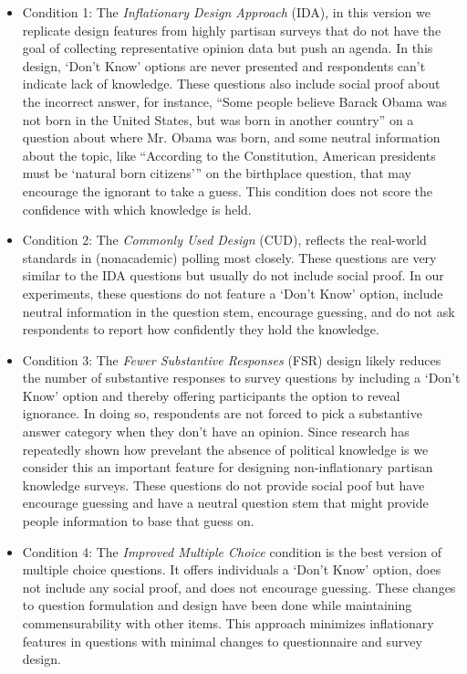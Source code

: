 \documentclass[12pt, letterpaper]{article}
\begin{document}
\begin{itemize}

  \item Condition 1: The \textit{Inflationary Design Approach} (IDA), in this version we replicate design features from highly partisan surveys that do not have the goal of collecting representative opinion data but push an agenda. In this design, `Don't Know' options are never presented and respondents can't indicate lack of knowledge. These questions also include social proof  about the incorrect answer, for instance, ``Some people believe Barack Obama was not born in the United States, but was born in another country'' on a question about where Mr. Obama was born, and some neutral information about the topic, like ``According to the Constitution, American presidents must be `natural born citizens''' on the birthplace question, that may encourage the ignorant to take a guess.  This condition does not score the confidence with which knowledge is held.

  \item Condition 2: The \textit{Commonly Used Design} (CUD), reflects the real-world standards in (nonacademic) polling most closely. These questions are very similar to the IDA questions but usually do not include social proof. In our experiments, these questions do not feature a `Don't Know' option, include neutral information in the question stem, encourage guessing, and do not ask respondents to report how confidently they hold the knowledge.

\item Condition 3: The \textit{Fewer Substantive Responses} (FSR) design likely reduces the number of substantive responses to survey questions by including a `Don't Know' option and thereby offering participants the option to reveal ignorance. In doing so, respondents are not forced to pick a substantive answer category when they don't have an opinion. Since research has repeatedly shown how prevelant the absence of political knowledge is we consider this an important feature for designing non-inflationary partisan knowledge surveys. These questions do not provide social poof but have encourage guessing and have a neutral question stem that might provide people information to base that guess on.

	\item Condition 4: The \textit{Improved Multiple Choice} condition is the best version of multiple choice questions. It offers individuals a `Don't Know' option, does not include any social proof, and does not encourage guessing. These changes to question formulation and design have been done while maintaining commensurability with other items. This approach minimizes inflationary features in questions with minimal changes to questionnaire and survey design.


\end{itemize}
\end{document}
